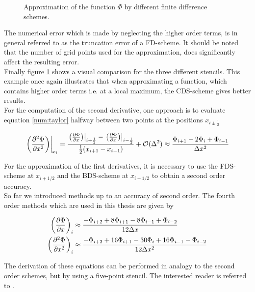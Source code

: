 \begin{figure}[!btp]
  \centering
  \caption{Approximation of the function $\Phi$ by different finite difference schemes.}
  \label{num:fd_image}
\end{figure}

The numerical error which is made by neglecting the higher order terms, is in general referred to as the truncation error of a FD-scheme.
It should be noted that the number of grid points used for the approximation, does significantly affect the resulting error.\\
Finally figure \ref{num:fd_image} shows a visual comparison for the three different stencils.
This example once again illustrates that when approximating a function, which contains higher order terms i.e. at a local maximum,
the  CDS-scheme gives better results.\\
For the computation of the second derivative, one approach is to evaluate equation \ref{num:taylor} halfway between two points at the positions $x_{i\pm\frac{1}{2}}$

\begin{align}
    \label{numerik:eq_2dfo2}
    \left.\left(\pdn[^2\Phi]{x^2}\right)\right|_{x_i} =
     \frac{\left.\left(\pdn[\Phi]{x}\right)\right|_{i+\frac{1}{2}}-
     \left.\left(\pdn[\Phi]{x}\right)\right|_{i-\frac{1}{2}}}
    {\frac{1}{2}(x_{i+1} - x_{i-1})} + \mathcal{O}(\Delta ^2)  \approx
    \frac{\Phi_{i+1} - 2\Phi_i + \Phi_{i-1}}{\Delta x^2}
\end{align}

For the approximation of the first derivatives, it is necessary to use the FDS-scheme at $x_{i+1/2}$ and the BDS-scheme at $x_{i-1/2}$ to obtain
a second order accuracy.\\
So far we introduced methods up to an accuracy of second order. The fourth order methods which are used in this thesis are given by

\begin{align}
    \left(\pdn[\Phi]{x}\right)_i &\approx \frac{-\Phi_{i+2} + 8\Phi_{i+1} - 8\Phi_{i-1} + \Phi_{i-2}}{12\Delta x} \\
    \left(\pdn[^2\Phi]{x^2}\right)_i &\approx \frac{-\Phi_{i+2} + 16\Phi_{i+1} -30\Phi_i + 16\Phi_{i-1} - \Phi_{i-2}}{12\Delta x^2} \\
\end{align}

The derivation of these equations can be performed in analogy to the second order schemes, but by using a five-point
stencil. The interested reader is referred to \citep{Fornberg1988}.

